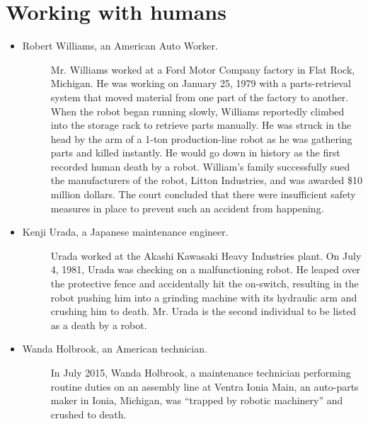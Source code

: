 \hypertarget{working-with-humans}{%
\section{Working with humans}\label{working-with-humans}}

\begin{itemize}
\item
  \begin{description}
  \item[Robert Williams, an American Auto Worker.]
  Mr. Williams worked at a Ford Motor Company factory in Flat Rock,
  Michigan. He was working on January 25, 1979 with a parts-retrieval
  system that moved material from one part of the factory to another.
  When the robot began running slowly, Williams reportedly climbed into
  the storage rack to retrieve parts manually. He was struck in the head
  by the arm of a 1-ton production-line robot as he was gathering parts
  and killed instantly. He would go down in history as the first
  recorded human death by a robot. William's family successfully sued
  the manufacturers of the robot, Litton Industries, and was awarded
  \$10 million dollars. The court concluded that there were insufficient
  safety measures in place to prevent such an accident from happening.
  \end{description}
\item
  \begin{description}
  \item[Kenji Urada, a Japanese maintenance engineer.]
  Urada worked at the Akashi Kawasaki Heavy Industries plant. On July 4,
  1981, Urada was checking on a malfunctioning robot. He leaped over the
  protective fence and accidentally hit the on-switch, resulting in the
  robot pushing him into a grinding machine with its hydraulic arm and
  crushing him to death. Mr. Urada is the second individual to be listed
  as a death by a robot.
  \end{description}
\item
  \begin{description}
  \item[Wanda Holbrook, an American technician.]
  In July 2015, Wanda Holbrook, a maintenance technician performing
  routine duties on an assembly line at Ventra Ionia Main, an auto-parts
  maker in Ionia, Michigan, was ``trapped by robotic machinery'' and
  crushed to death.
  \end{description}
\end{itemize}

